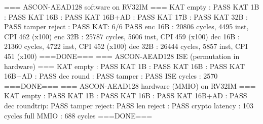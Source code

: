 \begin{codeblock}
=== ASCON-AEAD128 software on RV32IM ===
KAT empty : PASS
KAT 1B : PASS
KAT 16B : PASS
KAT 16B+AD : PASS
KAT 17B : PASS
KAT 32B : PASS
tamper reject : PASS
KAT: 6/6 PASS
enc 16B : 20806 cycles, 4495 inst, CPI 462 (x100)
enc 32B : 25787 cycles, 5606 inst, CPI 459 (x100)
dec 16B : 21360 cycles, 4722 inst, CPI 452 (x100)
dec 32B : 26444 cycles, 5857 inst, CPI 451 (x100)
===DONE===
=== ASCON-AEAD128 ISE (permutation in hardware) ===
KAT empty  : PASS
KAT 1B     : PASS
KAT 16B    : PASS
KAT 16B+AD : PASS
dec round  : PASS
tamper     : PASS
ISE cycles   : 2570
===DONE===
=== ASCON-AEAD128 hardware (MMIO) on RV32IM ===
KAT empty   : PASS
KAT 1B      : PASS
KAT 16B     : PASS
KAT 16B+AD  : PASS
dec roundtrip: PASS
tamper reject: PASS
len reject  : PASS
crypto latency : 103 cycles
full MMIO      : 688 cycles
===DONE===
\end{codeblock}
